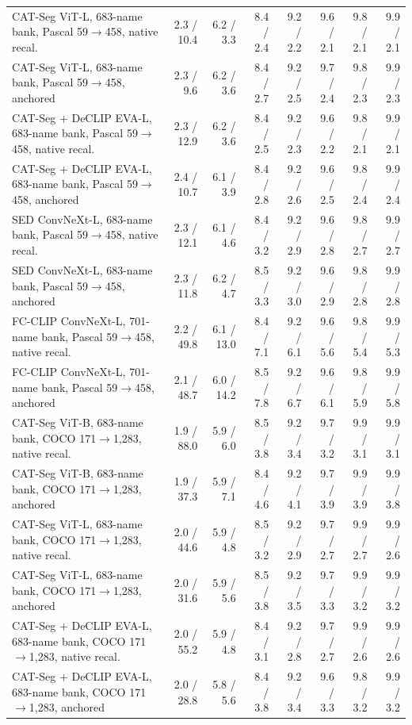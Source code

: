 \begin{tabular}{@{}lrrrrrrr@{}}
CAT-Seg ViT-L, 683-name bank, Pascal 59$\to$458, native recal. & 2.3 / 10.4 & 6.2 / 3.3 & 8.4 / 2.4 & 9.2 / 2.2 & 9.6 / 2.1 & 9.8 / 2.1 & 9.9 / 2.1 \\
CAT-Seg ViT-L, 683-name bank, Pascal 59$\to$458, anchored & 2.3 / 9.6 & 6.2 / 3.6 & 8.4 / 2.7 & 9.2 / 2.5 & 9.7 / 2.4 & 9.8 / 2.3 & 9.9 / 2.3 \\
CAT-Seg + DeCLIP EVA-L, 683-name bank, Pascal 59$\to$458, native recal. & 2.3 / 12.9 & 6.2 / 3.6 & 8.4 / 2.5 & 9.2 / 2.3 & 9.6 / 2.2 & 9.8 / 2.1 & 9.9 / 2.1 \\
CAT-Seg + DeCLIP EVA-L, 683-name bank, Pascal 59$\to$458, anchored & 2.4 / 10.7 & 6.1 / 3.9 & 8.4 / 2.8 & 9.2 / 2.6 & 9.6 / 2.5 & 9.8 / 2.4 & 9.9 / 2.4 \\
SED ConvNeXt-L, 683-name bank, Pascal 59$\to$458, native recal. & 2.3 / 12.1 & 6.1 / 4.6 & 8.4 / 3.2 & 9.2 / 2.9 & 9.6 / 2.8 & 9.8 / 2.7 & 9.9 / 2.7 \\
SED ConvNeXt-L, 683-name bank, Pascal 59$\to$458, anchored & 2.3 / 11.8 & 6.2 / 4.7 & 8.5 / 3.3 & 9.2 / 3.0 & 9.6 / 2.9 & 9.8 / 2.8 & 9.9 / 2.8 \\
FC-CLIP ConvNeXt-L, 701-name bank, Pascal 59$\to$458, native recal. & 2.2 / 49.8 & 6.1 / 13.0 & 8.4 / 7.1 & 9.2 / 6.1 & 9.6 / 5.6 & 9.8 / 5.4 & 9.9 / 5.3 \\
FC-CLIP ConvNeXt-L, 701-name bank, Pascal 59$\to$458, anchored & 2.1 / 48.7 & 6.0 / 14.2 & 8.5 / 7.8 & 9.2 / 6.7 & 9.6 / 6.1 & 9.8 / 5.9 & 9.9 / 5.8 \\
CAT-Seg ViT-B, 683-name bank, COCO 171$\to$1,283, native recal. & 1.9 / 88.0 & 5.9 / 6.0 & 8.5 / 3.8 & 9.2 / 3.4 & 9.7 / 3.2 & 9.9 / 3.1 & 9.9 / 3.1 \\
CAT-Seg ViT-B, 683-name bank, COCO 171$\to$1,283, anchored & 1.9 / 37.3 & 5.9 / 7.1 & 8.4 / 4.6 & 9.2 / 4.1 & 9.7 / 3.9 & 9.9 / 3.9 & 9.9 / 3.8 \\
CAT-Seg ViT-L, 683-name bank, COCO 171$\to$1,283, native recal. & 2.0 / 44.6 & 5.9 / 4.8 & 8.5 / 3.2 & 9.2 / 2.9 & 9.7 / 2.7 & 9.9 / 2.7 & 9.9 / 2.6 \\
CAT-Seg ViT-L, 683-name bank, COCO 171$\to$1,283, anchored & 2.0 / 31.6 & 5.9 / 5.6 & 8.5 / 3.8 & 9.2 / 3.5 & 9.7 / 3.3 & 9.9 / 3.2 & 9.9 / 3.2 \\
CAT-Seg + DeCLIP EVA-L, 683-name bank, COCO 171$\to$1,283, native recal. & 2.0 / 55.2 & 5.9 / 4.8 & 8.4 / 3.1 & 9.2 / 2.8 & 9.7 / 2.7 & 9.9 / 2.6 & 9.9 / 2.6 \\
CAT-Seg + DeCLIP EVA-L, 683-name bank, COCO 171$\to$1,283, anchored & 2.0 / 28.8 & 5.8 / 5.6 & 8.4 / 3.8 & 9.2 / 3.4 & 9.6 / 3.3 & 9.8 / 3.2 & 9.9 / 3.2 \\

\end{tabular}
